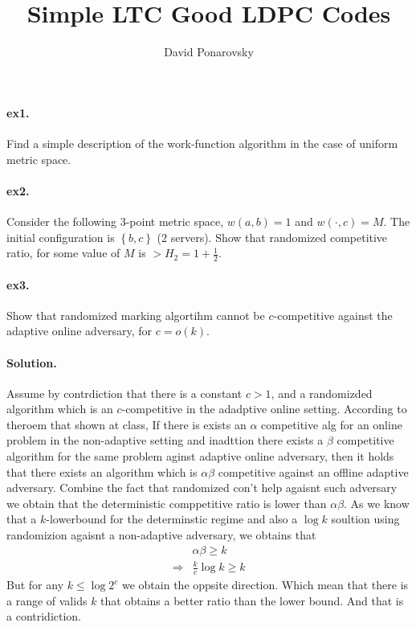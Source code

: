 \documentclass{article}
\begin{document}
\title{Simple LTC Good LDPC Codes} 
\author{David Ponarovsky}
\maketitle
{} 
\begin{multicols*}{2}
  \paragraph{ex1.} Find a simple description of the work-function algorithm in the case of uniform metric space. 
  \paragraph{ex2.} Consider the following $3$-point metric space, $w\left( a,b \right) = 1 $ and $w\left( \cdot, c  \right) = M $. The initial configuration is $ \left\{ b,c \right\}$ ($2$ servers). Show that randomized competitive ratio, for some value of $M$ is $ > H_{2} = 1 + \frac{1}{2}$. 
  \paragraph{ex3.} Show that randomized marking algortihm cannot be $c$-competitive against the adaptive online adversary, for $c=o\left( k \right)$. 
  \paragraph{Solution.} Assume by contrdiction that there is a constant $c> 1$, and a randomizded algorithm which is an $c$-competitive in the adadptive online setting. According to theroem that shown at class, If there is exists an $\alpha$ competitive alg for an online problem in the non-adaptive setting and inadttion there exists a $\beta$ competitive algorithm for the same problem aginst adaptive online adversary, then it holds that there exists an algorithm which is $\alpha\beta$ competitive against an offline adaptive adversary. 
  Combine the fact that randomized con't help agaisnt such adversary we obtain that the deterministic comppetitive ratio is lower than $\alpha\beta$. As we know that a $k$-lowerbound for the determinstic regime and also a $\log k$ soultion using randomizion agaisnt a non-adaptive adversary, we obtains that      
  \begin{equation*}
    \begin{split}
      & \alpha\beta \ge k \\ 
      \Rightarrow  & \frac{k}{c}\log k \ge k 
    \end{split}
  \end{equation*} But for any $ k \le \log 2^{c} $ we obtain the oppsite direction. Which mean that there is a range of valids $k$ that obtains a better ratio than the lower bound. And that is a contridiction.   


\end{multicols*}
\end{document}
